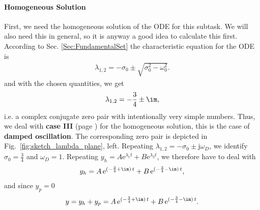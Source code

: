 \paragraph{Homogeneous Solution}
\label{Sec:TaskaHomo}
First, we need the homogeneous solution of the ODE for this subtask.
%
We will also need this in general, so it is anyway a good idea to calculate
this first.
%
According to Sec. \ref{Sec:FundamentalSet} the characteristic equation for the
ODE is 
\begin{align}
\lambda_{1,2} = -\sigma_0 \pm \sqrt{\sigma_0^2 - \omega_0^2}.
\end{align}
and with the chosen quantities, we get
\begin{align}
\lambda_{1,2} = -\frac{3}{4} \pm \im,
\end{align}
i.e. a complex conjugate zero pair with intentionally very simple numbers.
Thus, we deal with \textbf{case III} (page \pageref{pg:caseIII})
for the homogeneous solution, this is the case of \textbf{damped oscillation}.
The corresponding zero pair is depicted in Fig.~\ref{fig:sketch_lambda_plane},
left.
%
Repeating 
$\lambda_{1,2} = -\sigma_0 \pm \mathrm{j}\omega_D$,
we identify $\sigma_0 = \frac{3}{4}$ and $\omega_D = 1$.
Repeating 
$y_h = A \mathrm{e}^{\lambda_1 t} + B \mathrm{e}^{\lambda_2 t}$,
we therefore have to deal with
\begin{align}
y_h = A \, \mathrm{e}^{(-\frac{3}{4}+\im)\,t} + B \, \mathrm{e}^{(-\frac{3}{4}-\im)\,t},
\end{align}
and since $y_p=0$
\begin{align}
y = y_h + y_p = A \, \mathrm{e}^{(-\frac{3}{4}+\im)\,t} + B \, \mathrm{e}^{(-\frac{3}{4}-\im)\,t}.
\end{align}

